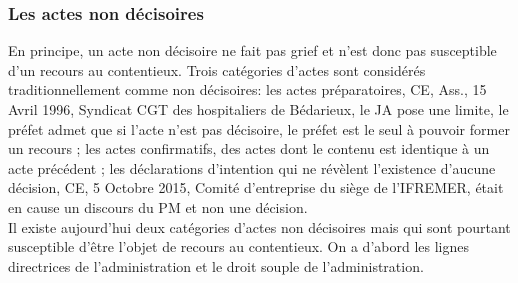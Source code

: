 \documentclass[10pt, a4paper, openany]{book}
\begin{document}
\subsubsection{Les actes non décisoires}

En principe, un acte non décisoire ne fait pas grief et n'est donc pas susceptible d'un recours au contentieux. Trois catégories d'actes sont considérés traditionnellement comme non décisoires: les actes préparatoires, CE, Ass., 15 Avril 1996, Syndicat CGT des hospitaliers de Bédarieux, le JA pose une limite, le préfet admet que si l'acte n'est pas décisoire, le préfet est le seul à pouvoir former un recours ; les actes confirmatifs, des actes dont le contenu est identique à un acte précédent ; les déclarations d'intention qui ne révèlent l'existence d'aucune décision, CE, 5 Octobre 2015, Comité d'entreprise du siège de l'IFREMER, était en cause un discours du PM et non une décision. \\
Il existe aujourd'hui deux catégories d'actes non décisoires mais qui sont pourtant susceptible d'être l'objet de recours au contentieux. On a d'abord les lignes directrices de l'administration et le droit souple de l'administration. 
\end{document}
